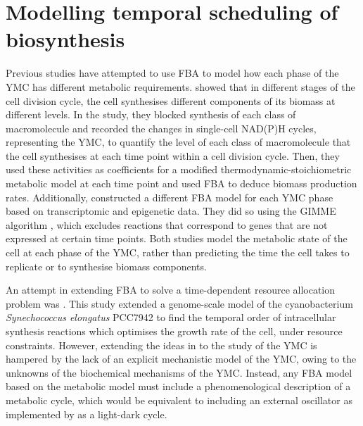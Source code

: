 \section{Modelling temporal scheduling of biosynthesis}
\label{sec:model-temporal}

Previous studies have attempted to use FBA to model how each phase of the YMC has different metabolic requirements.
\textcite{takhaveevTemporalSegregationBiosynthetic2023} showed that in different stages of the cell division cycle, the cell synthesises different components of its biomass at different levels.
In the study, they blocked synthesis of each class of macromolecule and recorded the changes in single-cell NAD(P)H cycles, representing the YMC, to quantify the level of each class of macromolecule that the cell synthesises at each time point within a cell division cycle.
Then, they used these activities as coefficients for a modified thermodynamic-stoichiometric metabolic model at each time point and used FBA to deduce biomass production rates.
Additionally, \textcite{cesurGenomeWideAnalysisYeast} constructed a different FBA model for each YMC phase based on transcriptomic and epigenetic data.
They did so using the GIMME algorithm \parencite{beckerContextSpecificMetabolicNetworks2008}, which excludes reactions that correspond to genes that are not expressed at certain time points.
Both studies model the metabolic state of the cell at each phase of the YMC, rather than predicting the time the cell takes to replicate or to synthesise biomass components.

An attempt in extending FBA to solve a time-dependent resource allocation problem was \textcite{reimersCellularTradeoffsOptimal2017}.
This study extended a genome-scale model of the cyanobacterium \textit{Synechococcus elongatus} PCC7942 to find the temporal order of intracellular synthesis reactions which optimises the growth rate of the cell, under resource constraints.
However, extending the ideas in \textcite{reimersCellularTradeoffsOptimal2017} to the study of the YMC is hampered by the lack of an explicit mechanistic model of the YMC, owing to the unknowns of the biochemical mechanisms of the YMC\@.
Instead, any FBA model based on the metabolic model must include a phenomenological description of a metabolic cycle, which would be equivalent to including an external oscillator as implemented by \textcite{reimersCellularTradeoffsOptimal2017} as a light-dark cycle.

